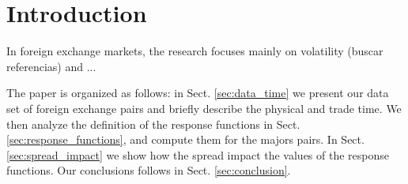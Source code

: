 \section{Introduction}\label{sec:introduction}

In foreign exchange markets, the research focuses mainly on volatility (buscar
referencias) and ...

The paper is organized as follows: in Sect. \ref{sec:data_time} we present our
data set of foreign exchange pairs and briefly describe the physical and trade time. We then
analyze the definition of the response functions in Sect.
\ref{sec:response_functions}, and compute them for the majors pairs.
In Sect. \ref{sec:spread_impact} we show how the spread impact the values of the
response functions. Our conclusions follows in Sect. \ref{sec:conclusion}.